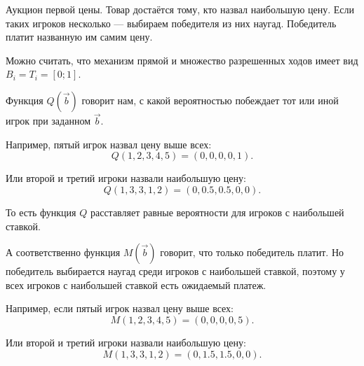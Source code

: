 \begin{myex} Аукцион первой цены. Товар достаётся тому, кто назвал наибольшую цену. Если таких игроков несколько — выбираем победителя из них наугад. Победитель платит названную им самим цену.

Можно считать, что механизм прямой и множество разрешенных ходов имеет вид $B_{i}=T_{i}=[0;1] $.

Функция $ Q(\vec{b}) $ говорит нам, с какой вероятностью побеждает тот или иной игрок при заданном $ \vec{b} $.

Например, пятый игрок назвал цену выше всех:
\begin{equation}
Q(1,2,3,4,5)=(0,0,0,0,1).
\end{equation}

Или второй и третий игроки назвали наибольшую цену:
\begin{equation}
Q(1,3,3,1,2)=(0,0.5,0.5,0,0).
\end{equation}

То есть функция $ Q $ расставляет равные вероятности для игроков с наибольшей ставкой.

А соответственно функция $ M(\vec{b}) $ говорит, что только победитель платит. Но победитель выбирается наугад среди игроков с наибольшей ставкой, поэтому у всех игроков с наибольшей ставкой есть ожидаемый платеж.

Например, если пятый игрок назвал цену выше всех:
\begin{equation}
M(1,2,3,4,5)=(0,0,0,0,5).
\end{equation}

Или второй и третий игроки назвали наибольшую цену:
\begin{equation}
M(1,3,3,1,2)=(0,1.5,1.5,0,0).
\end{equation}






\end{myex}


